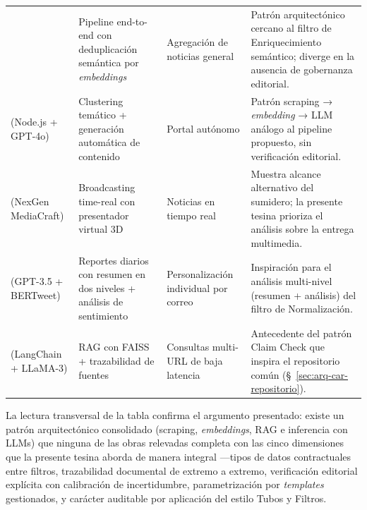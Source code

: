 \documentclass[12pt]{report}
\begin{document}
\begin{table}[!htbp]
\begin{tabularx}{\textwidth}{@{}>{\raggedright\arraybackslash}p{2.4cm} >{\raggedright\arraybackslash}p{2.5cm} >{\raggedright\arraybackslash}p{2.7cm} >{\raggedright\arraybackslash}X@{}}
                     & Pipeline end-to-end con deduplicación semántica por \textit{embeddings}
                     & Agregación de noticias general
                     & Patrón arquitectónico cercano al filtro de Enriquecimiento semántico; diverge en la ausencia de gobernanza editorial.                                                                            \\
    \addlinespace
    \citet{neupane2025} (Node.js + GPT-4o)
                     & Clustering temático + generación automática de contenido
                     & Portal autónomo
                     & Patrón scraping → \textit{embedding} → LLM análogo al pipeline propuesto, sin verificación editorial.                                                                                            \\
    \addlinespace
    \citet{ameer:2025} (NexGen MediaCraft)
                     & Broadcasting time-real con presentador virtual 3D
                     & Noticias en tiempo real
                     & Muestra alcance alternativo del sumidero; la presente tesina prioriza el análisis sobre la entrega multimedia.                                                                                   \\
    \addlinespace
    \citet{begum:2024} (GPT-3.5 + BERTweet)
                     & Reportes diarios con resumen en dos niveles + análisis de sentimiento
                     & Personalización individual por correo
                     & Inspiración para el análisis multi-nivel (resumen + análisis) del filtro de Normalización.                                                                                                       \\
    \addlinespace
    \citet{somasundharam:2025} (LangChain + LLaMA-3)
                     & RAG con FAISS + trazabilidad de fuentes
                     & Consultas multi-URL de baja latencia
                     & Antecedente del patrón Claim Check que inspira el repositorio común (\S~\ref{sec:arq-car-repositorio}).                                                                                          \\
    \bottomrule
  \end{tabularx}
\end{table}

La lectura transversal de la tabla confirma el argumento presentado: existe un patrón arquitectónico consolidado (scraping, \textit{embeddings}, RAG e inferencia con LLMs) que ninguna de las obras relevadas completa con las cinco dimensiones que la presente tesina aborda de manera integral ---tipos de datos contractuales entre filtros, trazabilidad documental de extremo a extremo, verificación editorial explícita con calibración de incertidumbre, parametrización por \textit{templates} gestionados, y carácter auditable por aplicación del estilo Tubos y Filtros.
\end{document}
